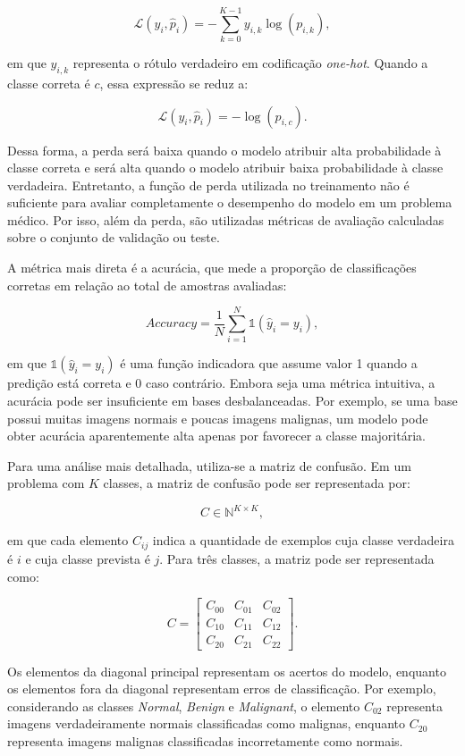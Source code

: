 \documentclass[
    12pt,
    openright,
    oneside,
    a4paper,
    english,
    brazil
]{abntex2}
\begin{document}
\[
\mathcal{L}(y_i, \hat{p}_i) =
-\sum_{k=0}^{K-1} y_{i,k}\log(p_{i,k}),
\]

em que \(y_{i,k}\) representa o rótulo verdadeiro em codificação \textit{one-hot}. Quando a classe correta é \(c\), essa expressão se reduz a:

\[
\mathcal{L}(y_i, \hat{p}_i) = -\log(p_{i,c}).
\]

Dessa forma, a perda será baixa quando o modelo atribuir alta probabilidade à classe correta e será alta quando o modelo atribuir baixa probabilidade à classe verdadeira. Entretanto, a função de perda utilizada no treinamento não é suficiente para avaliar completamente o desempenho do modelo em um problema médico. Por isso, além da perda, são utilizadas métricas de avaliação calculadas sobre o conjunto de validação ou teste.

A métrica mais direta é a acurácia, que mede a proporção de classificações corretas em relação ao total de amostras avaliadas:

\[
Accuracy =
\frac{1}{N}
\sum_{i=1}^{N}
\mathbb{1}(\hat{y}_i = y_i),
\]

em que \(\mathbb{1}(\hat{y}_i = y_i)\) é uma função indicadora que assume valor 1 quando a predição está correta e 0 caso contrário. Embora seja uma métrica intuitiva, a acurácia pode ser insuficiente em bases desbalanceadas. Por exemplo, se uma base possui muitas imagens normais e poucas imagens malignas, um modelo pode obter acurácia aparentemente alta apenas por favorecer a classe majoritária.

Para uma análise mais detalhada, utiliza-se a matriz de confusão. Em um problema com \(K\) classes, a matriz de confusão pode ser representada por:

\[
C \in \mathbb{N}^{K \times K},
\]

em que cada elemento \(C_{ij}\) indica a quantidade de exemplos cuja classe verdadeira é \(i\) e cuja classe prevista é \(j\). Para três classes, a matriz pode ser representada como:

\[
C =
\begin{bmatrix}
C_{00} & C_{01} & C_{02} \\
C_{10} & C_{11} & C_{12} \\
C_{20} & C_{21} & C_{22}
\end{bmatrix}.
\]

Os elementos da diagonal principal representam os acertos do modelo, enquanto os elementos fora da diagonal representam erros de classificação. Por exemplo, considerando as classes \textit{Normal}, \textit{Benign} e \textit{Malignant}, o elemento \(C_{02}\) representa imagens verdadeiramente normais classificadas como malignas, enquanto \(C_{20}\) representa imagens malignas classificadas incorretamente como normais.
\end{document}
